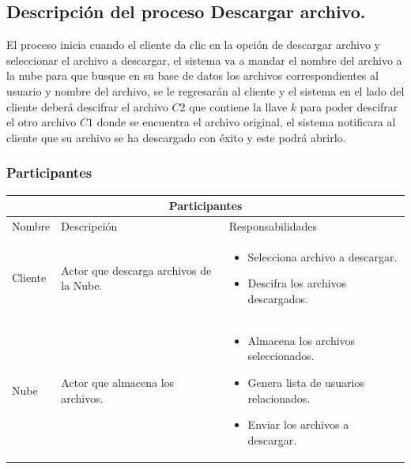 \subsection{Descripción del proceso Descargar archivo.}

El proceso inicia cuando el cliente da clic en la opción de descargar archivo y seleccionar el archivo a descargar, el sistema va a mandar el nombre del archivo a la nube para que busque en su base de datos los archivos correspondientes al usuario y nombre del archivo, se le regresarán al cliente y el sistema en el lado del cliente deberá descifrar el archivo $C2$ que contiene la llave $k$ para poder descifrar el otro archivo $C1$ donde se encuentra el archivo original, el sistema notificara al cliente que su archivo se ha descargado con éxito y este podrá abrirlo. \\


\subsubsection{Participantes}

\begin{tabular}{ |p{2cm}|p{6cm}|p{6cm}| }
\hline
\multicolumn{3}{|c|}{ Participantes } \\
\hline

{ Nombre } & { Descripción } & { Responsabilidades} \\
\hline
{ Cliente } & Actor que descarga archivos de la Nube. & 
\begin{itemize} 
\item Selecciona archivo a descargar.
\item Descifra los archivos descargados.
\end{itemize} \\ 
\hline
{ Nube } & Actor que almacena los archivos. & 
\begin{itemize} 
\item Almacena los archivos seleccionados.
\item Genera lista de usuarios relacionados.
\item Enviar los archivos a descargar.
\end{itemize} \\ 
\hline
\end{tabular}

